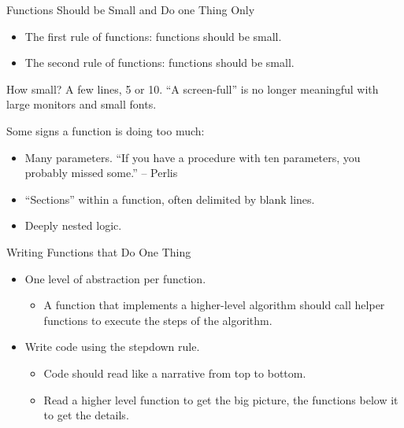 \documentclass{beamer}
\author[Chris Simpkins] 
{Christopher Simpkins \\\texttt{chris.simpkins@gatech.edu}}
\institute[Georgia Tech] %
\date[CS 1331]{}
\begin{document}
\begin{frame}
  \titlepage
\end{frame}

\begin{frame}[fragile]{Functions Should be Small and Do one Thing Only}


\begin{itemize}
\item The first rule of functions: functions should be small.
\item The second rule of functions: functions should be small.
\end{itemize}
How small?  A few lines, 5 or 10.  ``A screen-full'' is no longer meaningful with large monitors and small fonts.

Some signs a function is doing too much:
\begin{itemize}
\item Many parameters.  ``If you have a procedure with ten parameters, you probably missed some.'' -- Perlis
\item ``Sections'' within a function, often delimited by blank lines.
\item Deeply nested logic.
\end{itemize}

\end{frame}

\begin{frame}[fragile]{Writing Functions that Do One Thing}


\begin{itemize}
\item One level of abstraction per function.
\begin{itemize}
\item A function that implements a higher-level algorithm should call helper functions to execute the steps of the algorithm.
\end{itemize}
\item Write code using the stepdown rule.
\begin{itemize}
\item Code should read like a narrative from top to bottom.
\item Read a higher level function to get the big picture, the functions below it to get the details.
\end{itemize}

\end{itemize}


\end{frame}
\end{document}
